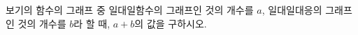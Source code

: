 보기의 함수의 그래프 중 일대일함수의 그래프인 것의 개수를 $a$, 일대일대응의 그래프인 것의 개수를 $b$라 할 때, $a+b$의 값을 구하시오. \bogi{\resizebox{\ifdim\width>\linewidth\linewidth\else\width\fi}{!}{}}
